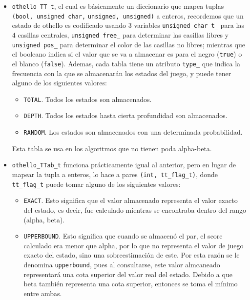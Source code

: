 \documentclass[a4paper,10pt]{article}
\begin{document}
  \begin{itemize}
    \item \verb|othello_TT_t|, el cual es b\'asicamente un diccionario que mapea tuplas
    \verb|(bool, unsigned char,| \verb|unsigned, unsigned)| a enteros, recordemos que un 
    estado de othello es codificado usando 3 variables \verb|unsigned char t_| para 
    las 4 casillas centrales, \verb|unsigned free_| para determinar las casillas libres 
    y \verb|unsigned pos_| para determinar el color de las casillas no libres; mientras 
    que el booleano indica si el valor que se va a almacenar es para el negro (\verb|true|)
    o el blanco (\verb|false|). Ademas, cada tabla tiene un atributo \verb|type_| que 
    indica la frecuencia con la que se almacenar\'an los estados del juego, y puede tener 
    alguno de los siguientes valores:

    \begin{itemize}
      \item \verb|TOTAL|. Todos los estados son almacenados.
      \item \verb|DEPTH|. Todos los estados hasta cierta profundidad son almacenados.
      \item \verb|RANDOM|. Los estados son almacenados con una determinada probabilidad. 
    \end{itemize}

    Esta tabla se usa en los algoritmos que no tienen poda alpha-beta.

    \item \verb|othello_TTab_t| funciona pr\'acticamente igual al anterior, pero en lugar 
    de mapear la tupla a enteros, lo hace a pares \verb|(int, tt_flag_t)|, donde 
    \verb|tt_flag_t| puede tomar alguno de los siguientes valores:

    \begin{itemize}
      \item \verb|EXACT|. Esto significa que el valor almacenado representa el valor exacto 
      del estado, es decir, fue calculado mientras se encontraba dentro del rango (alpha, 
      beta).

      \item \verb|UPPERBOUND|. Esto significa que cuando se almacen\'o el par, el score  
      calculado era menor que alpha, por lo que no representa el valor de juego exacto 
      del estado, sino una sobreestimaci\'on de este. Por esta raz\'on se le denomina 
      \verb|upperbound|, pues al consultarse, este valor almcaneado representar\'a una 
      cota superior del valor real del estado. Debido a que beta tambi\'en representa 
      una cota superior, entonces se toma el m\'inimo entre ambas.


\end{itemize}
\end{itemize}
\end{document}
